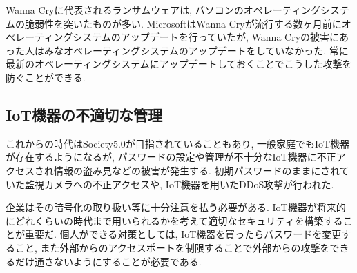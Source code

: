 \documentclass{jsarticle}
\begin{document}
Wanna Cryに代表されるランサムウェアは, パソコンのオペレーティングシステムの脆弱性を突いたものが多い. MicrosoftはWanna Cryが流行する数ヶ月前にオペレーティングシステムのアップデートを行っていたが, Wanna Cryの被害にあった人はみなオペレーティングシステムのアップデートをしていなかった. 常に最新のオペレーティングシステムにアップデートしておくことでこうした攻撃を防ぐことができる. 

\subsection{IoT機器の不適切な管理}
これからの時代はSociety5.0が目指されていることもあり, 一般家庭でもIoT機器が存在するようになるが, パスワードの設定や管理が不十分なIoT機器に不正アクセスされ情報の盗み見などの被害が発生する. 初期パスワードのままにされていた監視カメラへの不正アクセスや, IoT機器を用いたDDoS攻撃が行われた.

企業はその暗号化の取り扱い等に十分注意を払う必要がある. IoT機器が将来的にどれくらいの時代まで用いられるかを考えて適切なセキュリティを構築することが重要だ. 個人ができる対策としては, IoT機器を買ったらパスワードを変更すること, また外部からのアクセスポートを制限することで外部からの攻撃をできるだけ通さないようにすることが必要である.
\end{document}
